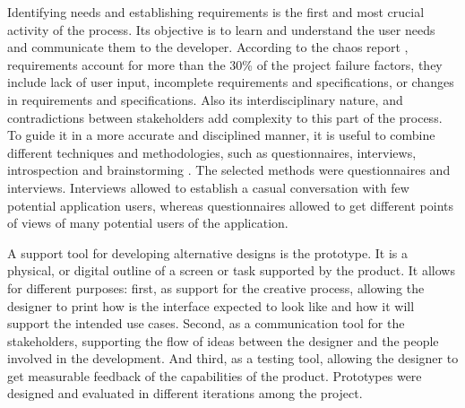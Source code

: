 Identifying needs and establishing requirements is the first and most crucial activity of the process. Its objective is to learn and understand the user needs and communicate them to the developer. According to the chaos report \cite{Group1994}, requirements account for more than the 30\% of the project failure factors, they include lack  of user input, incomplete requirements and specifications, or changes in requirements and specifications. Also its interdisciplinary nature, and contradictions between stakeholders add complexity to this part of the process. To guide it in a more accurate and disciplined manner, it is useful to combine different techniques and methodologies, such as questionnaires, interviews, introspection and brainstorming \cite{Coulin2005}. The selected methods were questionnaires and interviews. Interviews allowed to establish a casual conversation with few potential application users, whereas questionnaires allowed to get different points of views of many potential users of the application. 

A support tool for developing alternative designs is the prototype. It is a physical, or digital outline of a screen or task supported by the product. It allows for different purposes: first, as support for the creative process, allowing the designer to print how is the interface expected to look like and how it will support the intended use cases. Second, as a communication tool for the stakeholders, supporting the flow of ideas between the designer and the people involved in the development. And third, as a testing tool, allowing the designer to get measurable feedback of the capabilities of the product. Prototypes were designed and evaluated in different iterations among the project.